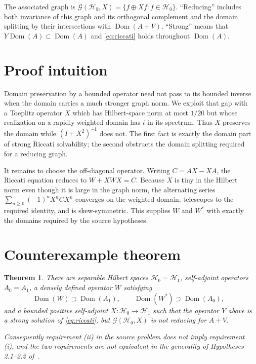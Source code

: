 \documentclass[11pt]{article}
\newtheorem{theorem}{Theorem}
\newcommand{\cG}{\mathcal G}
\newcommand{\cH}{\mathcal H}
\newcommand{\Dom}{\operatorname{Dom}}
\begin{document}
The associated graph is
$\cG(\cH_0,X)=\{f\oplus Xf:f\in\cH_0\}$.  ``Reducing'' includes both
invariance of this graph and its orthogonal complement and the domain
splitting by their intersections with $\Dom(A+V)$.  ``Strong'' means that
$Y\Dom(A)\subset\Dom(A)$ and \eqref{eq:riccati} holds throughout
$\Dom(A)$.

\section{Proof intuition}

Domain preservation by a bounded operator need not pass to its bounded
inverse when the domain carries a much stronger graph norm.  We exploit that
gap with a Toeplitz operator $X$ which has Hilbert-space norm at most $1/20$
but whose realization on a rapidly weighted domain has $i$ in its spectrum.
Thus $X$ preserves the domain while $(I+X^2)^{-1}$ does not.  The first fact
is exactly the domain part of strong Riccati solvability; the second obstructs
the domain splitting required for a reducing graph.

It remains to choose the off-diagonal operator.  Writing
$C=AX-XA$, the Riccati equation reduces to
$W+XWX=C$.  Because $X$ is tiny in the Hilbert norm even though it is large
in the graph norm, the alternating series
$\sum_{n\ge0}(-1)^nX^nCX^n$ converges on the weighted domain, telescopes to
the required identity, and is skew-symmetric.  This supplies $W$ and $W^*$
with exactly the domains required by the source hypotheses.

\section{Counterexample theorem}

\begin{theorem}\label{thm:main}
There are separable Hilbert spaces $\cH_0=\cH_1$, self-adjoint operators
$A_0=A_1$, a densely defined operator $W$ satisfying
\[
 \Dom(W)\supset\Dom(A_1),\qquad
 \Dom(W^*)\supset\Dom(A_0),
\]
and a bounded positive self-adjoint $X:\cH_0\to\cH_1$ such that the operator
$Y$ above is a strong solution of \eqref{eq:riccati}, but
$\cG(\cH_0,X)$ is not reducing for $A+V$.

Consequently requirement \emph{(ii)} in the source problem does not imply
requirement \emph{(i)}, and the two requirements are not equivalent in the
generality of Hypotheses 2.1--2.2 of~\cite{MSS13}.
\end{theorem}
\end{document}
